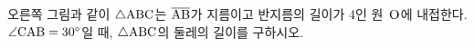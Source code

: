 \noindent\begin{minipage}[t]{0.58\linewidth}\vspace{0pt}\raggedright 오른쪽 그림과 같이 $\triangle\mathrm{ABC}$는 $\overline{\mathrm{AB}}$가 지름이고 반지름의 길이가 $4$인 원~$\mathrm{O}$에 내접한다. $\angle\mathrm{CAB}=30^\circ$일 때, $\triangle\mathrm{ABC}$의 둘레의 길이를 구하시오.\end{minipage}\hfill\begin{minipage}[t]{0.4\linewidth}\vspace{0pt}\centering \resizebox{\ifdim\width>\linewidth\linewidth\else\width\fi}{!}{}\end{minipage}\par
